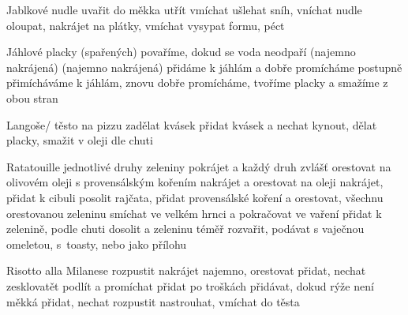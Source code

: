\documentclass[12pt,a4paper]{article}
\begin{document}
\begin{recipe}{Jablkové nudle}
   uvařit do měkka
   utřít
   vmíchat
   ušlehat sníh, vníchat nudle
   oloupat, nakrájet na plátky, vmí\-chat
   vysypat formu, péct
\end{recipe}
\newpage

\begin{recipe}{Jáhlové placky}
   (spařených)
   povaříme, dokud se voda neodpaří
   (najemno nakrájená)
   (najemno nakrájená)
   přidáme k jáhlám a dobře promícháme
   postupně přimícháváme k jáhlám, znovu dobře promícháme, tvoříme placky a smažíme z obou stran
\end{recipe}
\newpage

\begin{recipe}{Langoše/ těsto na pizzu}
   zadělat kvásek
   přidat kvásek a nechat kynout, dělat placky, smažit v oleji
   dle chuti
\end{recipe}
\newpage

\begin{recipe}{Ratatouille}
   jednotlivé druhy zeleniny pokrájet a každý druh zvlášť orestovat na olivovém oleji s provensálským kořením
   nakrájet a orestovat na oleji
   nakrájet, přidat k cibuli
   posolit rajčata, přidat provensálské koření a orestovat, všechnu orestovanou zeleninu smíchat ve velkém hrnci a pokračovat ve vaření
   přidat k zelenině, podle chuti dosolit a zeleninu téměř rozvařit, podávat s vaječnou omeletou, s~toasty, nebo jako přílohu
\end{recipe}
\newpage

\begin{recipe}{Risotto alla Milanese}
   rozpustit
   nakrájet najemno, orestovat
   přidat, nechat zesklovatět
   podlít a promíchat
   přidat
   po troškách přidávat, dokud rýže není měkká
   přidat, nechat rozpustit
   nastrouhat, vmíchat do těsta
\end{recipe}
\newpage
\end{document}
